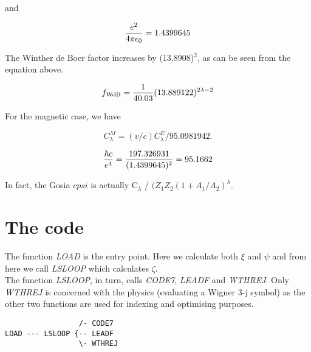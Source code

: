and

\begin{equation}
{e^2 \over 4 \pi \epsilon_0} = 1.4399645
\end{equation}


The Winther de Boer factor increases by (13.8908)$^2$, as can be seen from the
equation above.

\begin{equation}
f_{\mathrm{WdB}} = {1 \over 40.03} (13.889122)^{2\lambda-2}
\end{equation}

For the magnetic case, we have

\begin{equation}
C_\lambda^M = (v/c) C_\lambda^E / 95.0981942.
\end{equation}

\begin{equation}
{\hbar c \over e^4} = {197.326931 \over (1.4399645)^2} = 95.1662
\end{equation}

In fact, the Gosia $cpsi$ is actually C$_\lambda$ / $(Z_1 Z_2 (1 +
A_1/A_2)^\lambda$.

\section{The code}

The function {\em LOAD} is the entry point. Here we calculate both $\xi$ and
$\psi$ and from here we call {\em LSLOOP} which calculates $\zeta$.\\

The function {\em LSLOOP}, in turn, calls {\em CODE7}, {\em LEADF} and {\em
WTHREJ}. Only {\em WTHREJ} is concerned with the physics (evaluating a
Wigner 3-j symbol) as the other two functions are used for indexing and
optimising purposes.\\

\begin{verbatim}
                 /- CODE7
LOAD --- LSLOOP {-- LEADF
                 \- WTHREJ
\end{verbatim}

